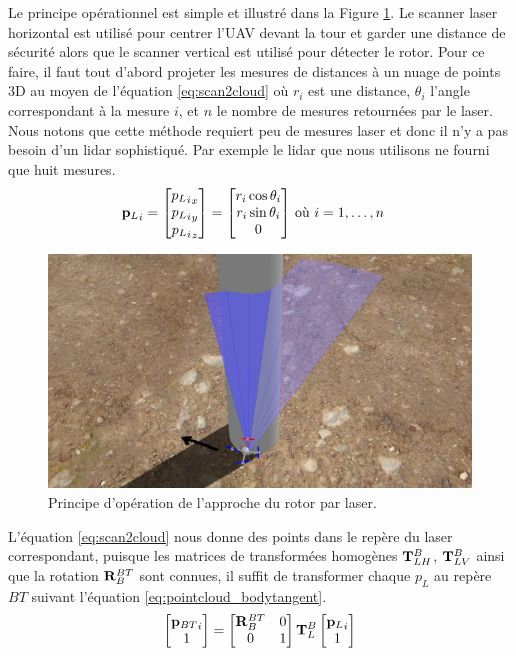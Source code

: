 Le principe opérationnel est simple et illustré dans la Figure \ref{fig:approach}. Le scanner laser horizontal est utilisé pour centrer l'UAV devant la tour et garder une distance de sécurité alors que le scanner vertical est utilisé pour détecter le rotor. Pour ce faire, il faut tout d'abord projeter les mesures de distances à un nuage de points 3D au moyen de l'équation \ref{eq:scan2cloud} où $r_i$ est une distance, $\theta_i$ l'angle correspondant à la mesure $i$, et $n$ le nombre de mesures retournées par le laser. Nous notons que cette méthode requiert peu de mesures laser et donc il n'y a pas besoin d'un lidar sophistiqué. Par exemple le lidar que nous utilisons ne fourni que huit mesures.
\begin{align}
  {\mathbf{p}_{L}}_i = \begin{bmatrix}
    {{p_L}_i}_x \\
    {{p_L}_i}_y \\
    {{p_L}_i}_z
  \end{bmatrix} = \begin{bmatrix}r_i \cos \theta_i \\ r_i \sin \theta_i \\ 0 \end{bmatrix} & \text{ où } i=1,\ldots,n
    \label{eq:scan2cloud}
\end{align}
\begin{figure}[htp]
  \centering
  \includegraphics[width=0.8\linewidth]{images/principe_operation.jpg}
  \caption{Principe d'opération de l'approche du rotor par laser.}
  \label{fig:approach}
\end{figure}
L'équation \ref{eq:scan2cloud} nous donne des points dans le repère du laser correspondant, puisque les matrices de transformées homogènes $\mathbf{T}_{LH}^B$, $\mathbf{T}_{LV}^B$ ainsi que la rotation $\mathbf{R}_B^{BT}$ sont connues, il suffit de transformer chaque $p_L$ au repère ${BT}$ suivant l'équation \ref{eq:pointcloud_bodytangent}.
\begin{align}
  \begin{bmatrix}{\mathbf{p}_{BT}}_i \\ 1\end{bmatrix} = \begin{bmatrix}
    \mathbf{R}_B^{BT} & 0 \\
    0 & 1
  \end{bmatrix} \mathbf{T}_{L}^B\begin{bmatrix}{\mathbf{p}_{L}}_i \\ 1\end{bmatrix}
  \label{eq:pointcloud_bodytangent}
\end{align}


